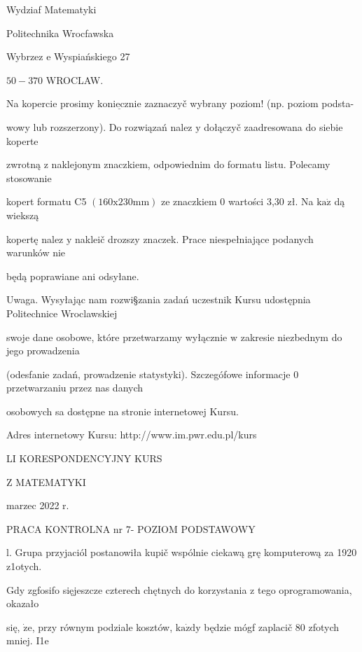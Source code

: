 \documentclass[a4paper,12pt]{article}
\begin{document}
Wydziaf Matematyki

Politechnika Wrocfawska

Wybrzez $\mathrm{e}$ Wyspiańskiego 27

$50-370$ WROCLAW.

Na kopercie prosimy $\underline{\mathrm{k}\mathrm{o}\mathrm{n}\mathrm{i}\mathrm{e}\mathrm{c}\mathrm{z}\mathrm{n}\mathrm{i}\mathrm{e}}$ zaznaczyč wybrany poziom! (np. poziom podsta-

wowy lub rozszerzony). Do rozwiązań nalez $\mathrm{y}$ dołączyč zaadresowana do siebie koperte

zwrotną $\mathrm{z}$ naklejonym znaczkiem, odpowiednim do formatu listu. Polecamy stosowanie

kopert formatu C5 $(160\mathrm{x}230\mathrm{m}\mathrm{m})$ ze znaczkiem $0$ wartości 3,30 zł. Na $\mathrm{k}\mathrm{a}\dot{\mathrm{z}}$ dą wiekszą

kopertę nalez $\mathrm{y}$ nakleič drozszy znaczek. Prace niespełniające podanych warunków nie

będą poprawiane ani odsyłane.

Uwaga. Wysyłając nam rozwi\S zania zadań uczestnik Kursu udostępnia Politechnice Wroclawskiej

swoje dane osobowe, które przetwarzamy wyłącznie $\mathrm{w}$ zakresie niezbednym do jego prowadzenia

(odesfanie zadań, prowadzenie statystyki). Szczegófowe informacje $0$ przetwarzaniu przez nas danych

osobowych sa dostępne na stronie internetowej Kursu.

Adres internetowy Kursu: http://www.im.pwr.edu.pl/kurs







LI KORESPONDENCYJNY KURS

Z MATEMATYKI

marzec 2022 r.

PRACA KONTROLNA nr 7- POZIOM PODSTAWOWY

l. Grupa przyjaciól postanowiła kupič wspólnie ciekawą grę komputerową za 1920 z1otych.

Gdy zgfosifo sięjeszcze czterech chętnych do korzystania $\mathrm{z}$ tego oprogramowania, okazało

się, $\dot{\mathrm{z}}\mathrm{e}$, przy równym podziale kosztów, $\mathrm{k}\mathrm{a}\dot{\mathrm{z}}\mathrm{d}\mathrm{y}$ będzie mógf zaplacič 80 zfotych mniej. I1e
\end{document}
